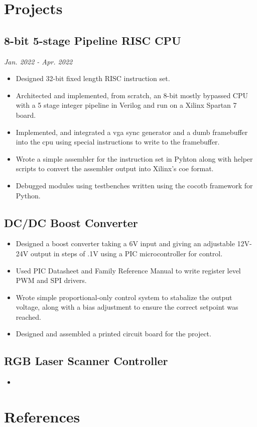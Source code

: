 \documentclass{article}
\begin{document}
\begin{spacing}{.5}
\section{Projects}
	\subsection{8-bit 5-stage Pipeline RISC CPU} \hfill \scriptsize{\textsl{Jan. 2022 - Apr. 2022}}
		\begin{itemize}[label=--,itemsep=-.75ex]
			\item \small{Designed 32-bit fixed length RISC instruction set.}
			\item \small{Architected and implemented, from scratch, an 8-bit mostly bypassed CPU with a 5 stage integer pipeline in Verilog and run on a Xilinx Spartan 7 board.}
			\item \small{Implemented, and integrated a vga sync generator and a dumb framebuffer into the cpu using special instructions to write to the framebuffer.}
			\item \small{Wrote a simple assembler for the instruction set in Pyhton along with helper scripts to convert the assembler output into Xilinx's coe format.}
			\item \small{Debugged modules using testbenches written using the cocotb framework for Python.}
		\end{itemize}
	\subsection{DC/DC Boost Converter}
		\begin{itemize}[label=--,itemsep=-.75ex]
			\item \small{Designed a boost converter taking a 6V input and giving an adjustable 12V-24V output in steps of .1V using a PIC microcontroller for control.}
			\item \small{Used PIC Datasheet and Family Reference Manual to write register level PWM and SPI drivers.}
			\item \small{Wrote simple proportional-only control system to stabalize the output voltage, along with a bias adjustment to ensure the correct setpoint was reached.}
			\item \small{Designed and assembled a printed circuit board for the project.}
		\end{itemize}
	\subsection{RGB Laser Scanner Controller}
		\begin{itemize}[label=--,itemsep=-.75ex]
			\item \small{}
		\end{itemize}

\section{References}

\end{spacing}
\end{document}
